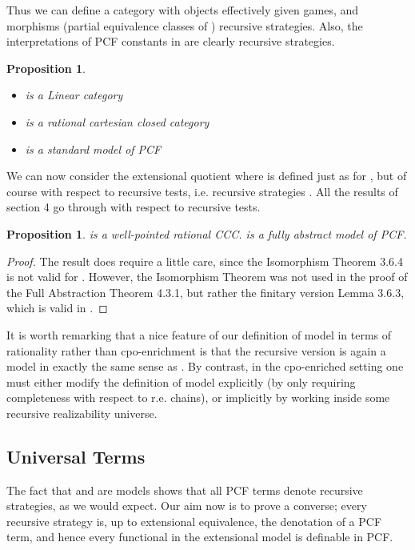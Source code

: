 \documentclass[11pt]{article}
\newtheorem{proposition}[theorem]{Proposition}
\begin{document}
Thus we can define a category  with objects effectively  given
games, and morphisms (partial equivalence classes of ) recursive strategies.
Also, the interpretations of PCF constants in  are clearly
recursive strategies.

\begin{proposition}
\begin{itemize}
\item[(i)]  is a Linear category
\item[(ii)]  is a rational cartesian closed category
\item[(iii)]  is a standard model of PCF
\end{itemize}
\end{proposition}

We can now consider the extensional quotient  where  is defined just
as for , but of course with respect to recursive tests,
i.e. recursive strategies . All the results
of section 4 go through with respect to recursive tests.

\begin{proposition}
 is a well-pointed rational CCC.  is a
fully abstract model of PCF.
\end{proposition}
\begin{proof} The result does require a little care, since the
Isomorphism Theorem 3.6.4 is not valid for .
However, the Isomorphism Theorem was not used in the proof of the
Full Abstraction Theorem 4.3.1, but rather the finitary version
Lemma 3.6.3, which is valid in .
\end{proof}

It is worth remarking that a nice feature of our definition of model in
terms of rationality rather than cpo-enrichment is that the recursive
version  is again a model in exactly the same sense as . By
contrast, in the cpo-enriched setting one must either modify the definition
of model explicitly (by only requiring completeness with respect to
r.e. chains), or implicitly by working inside some recursive realizability
universe.

\subsection{ Universal Terms }

The fact that  and  are models
shows that all PCF terms denote recursive strategies, as we would expect.
Our aim now is to prove a converse; every recursive strategy is, up to
extensional equivalence, the denotation of a PCF term, and hence every
functional in the extensional model  is definable in PCF.
\end{document}
